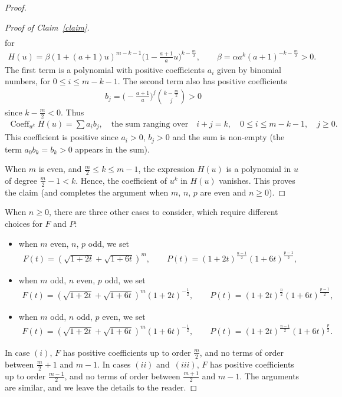 \documentclass[11pt]{article}
\numberwithin{equation}{section}
\numberwithin{equation}{section}
\begin{document}
\begin{proof}
\begin{proof}[Proof of Claim~\ref{claim}]
\begin{gather*}
\end{gather*}
for
\begin{gather*}
H(u)=\beta (1+(a+1)u)^{m-k-1} \biggl(1-\frac{a+1}{a}u\biggr)^{k-\frac{m}{2}}, \qquad \beta=\alpha a^{k} (a+1)^{-k-\frac{m}{2}}>0.
\end{gather*}
The first term is a polynomial with positive coefficients $a_i$ given by binomial numbers, for $0\leq i\leq m-k-1$. The second term also has positive coefficients
\begin{gather*}
b_j=\biggl(-\frac{a+1}{a}\biggr)^j\binom{k-\frac{m}{2}}{j}>0
\end{gather*}
since $k-\frac{m}{2}<0$. Thus
\begin{gather*}
\operatorname{Coeff}_{u^k} H(u)=\!\sum a_i b_j,\quad \text{the sum ranging over}\!\quad i+j=k, \quad 0\leq i\leq m-k-1, \quad j\geq 0.
\end{gather*}
This coefficient is positive since $a_i>0$, $b_j> 0$ and the sum is non-empty (the term $a_0b_k=b_k>0$ appears in the sum).

When $m$ is even, and $\frac{m}{2}\leq k\leq m-1$, the expression $H(u)$ is a polynomial in $u$ of degree $\frac{m}{2}-1<k$. Hence, the coefficient of $u^k$ in $H(u)$ vanishes.
This proves the claim (and completes the argument when $m$, $n$, $p$ are even and $n\geq 0$).
\end{proof}

When $n\geq 0$, there are three other cases to consider, which require different choices for $F$ and $P$:
\begin{itemize}\itemsep=0pt
\item [$(i)$] when $m$ even, $n$, $p$ odd, we set
\begin{gather*}
F(t)=\left(\sqrt{1+2t}+\sqrt{1+6t}\right)^m, \qquad
P(t)=(1+2t)^{\frac{n-1}{2}} (1+6t)^{\frac{p-1}{2}},
\end{gather*}
\item [$(ii)$] when $m$ odd, $n$ even, $p$ odd, we set
\begin{gather*}
F(t)=\left(\sqrt{1+2t}+\sqrt{1+6t}\right)^m {(1+2t)}^{-\frac{1}{2}}, \qquad
P(t)=(1+2t)^{\frac{n}{2}} (1+6t)^{\frac{p-1}{2}},
\end{gather*}
\item [$(iii)$] when $m$ odd, $n$ odd, $p$ even, we set
\begin{gather*}
F(t)=\left(\sqrt{1+2t}+\sqrt{1+6t}\right)^m (1+6t)^{-\frac{1}{2}}, \qquad
P(t)=(1+2t)^{\frac{n-1}{2}} (1+6t)^{\frac{p}{2}}.
\end{gather*}
\end{itemize}
In case $(i)$, $F$ has positive coefficients up to order $\frac{m}{2}$, and no terms of order between $\frac{m}{2}+1$ and $m-1$.
In cases $(ii)$ and~$(iii)$, $F$ has positive coefficients up to order $\frac{m-1}{2}$, and no terms of order between $\frac{m+1}{2}$ and $m-1$. The arguments are similar, and we leave the details to the reader.


\end{proof}
\end{document}
